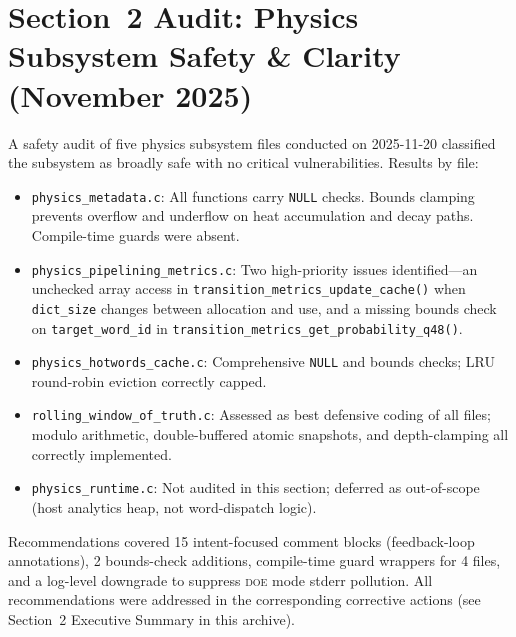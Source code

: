 
\section*{Section~2 Audit: Physics Subsystem Safety \& Clarity (November 2025)}

A safety audit of five physics subsystem files conducted on 2025-11-20
classified the subsystem as broadly safe with no critical vulnerabilities.
Results by file:

\begin{itemize}
  \item \texttt{physics\_metadata.c}: All functions carry \texttt{NULL} checks.
        Bounds clamping prevents overflow and underflow on heat accumulation
        and decay paths. Compile-time guards were absent.
  \item \texttt{physics\_pipelining\_metrics.c}: Two high-priority issues
        identified---an unchecked array access in \texttt{transition\_metrics\_update\_cache()}
        when \texttt{dict\_size} changes between allocation and use, and a
        missing bounds check on \texttt{target\_word\_id} in
        \texttt{transition\_metrics\_get\_probability\_q48()}.
  \item \texttt{physics\_hotwords\_cache.c}: Comprehensive \texttt{NULL} and
        bounds checks; LRU round-robin eviction correctly capped.
  \item \texttt{rolling\_window\_of\_truth.c}: Assessed as best defensive
        coding of all files; modulo arithmetic, double-buffered atomic
        snapshots, and depth-clamping all correctly implemented.
  \item \texttt{physics\_runtime.c}: Not audited in this section; deferred
        as out-of-scope (host analytics heap, not word-dispatch logic).
\end{itemize}

Recommendations covered 15 intent-focused comment blocks (feedback-loop
annotations), 2 bounds-check additions, compile-time guard wrappers for 4
files, and a log-level downgrade to suppress \textsc{doe} mode stderr
pollution. All recommendations were addressed in the corresponding corrective
actions (see Section~2 Executive Summary in this archive).
